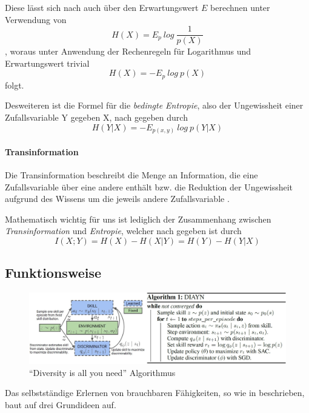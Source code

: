 Diese lässt sich nach \cite{elements_cover} auch über den Erwartungswert $ E $ berechnen unter Verwendung von
\begin{equation*}
    H(X) = E_p\ log\ \frac{1}{p(X)} \label{eq:entropy_1}
\end{equation*}
, woraus unter Anwendung der Rechenregeln für Logarithmus und Erwartungswert trivial
\begin{equation}
    H(X) = - E_p\ log\ p(X) \label{eq:entropy_2}
\end{equation}
folgt.

Desweiteren ist die Formel für die \textit{bedingte Entropie}, also der Ungewissheit einer Zufallsvariable Y gegeben X, nach \cite{elements_cover} gegeben durch
\begin{equation}
    H(Y|X) = - E_{p(x,y)}\ log\ p(Y|X) \label{eq:condit_entropy}
\end{equation}

\paragraph{Transinformation}

Die Transinformation beschreibt die Menge an Information, die eine Zufallsvariable über eine andere enthält bzw. die Reduktion der Ungewissheit aufgrund des Wissens um die jeweils andere Zufallsvariable \cite{elements_cover}.

Mathematisch wichtig für uns ist lediglich der Zusammenhang zwischen \textit{Transinformation} und \textit{Entropie}, welcher nach \cite{elements_cover} gegeben ist durch
\begin{equation}
    I(X;Y) = H(X) - H(X|Y) = H(Y) - H(Y|X) \label{eq:trans_ent}
\end{equation}

\subsection{Funktionsweise}
\label{sec:diversity_howitworks}
\begin{figure}[h]
\includegraphics[width=\textwidth, keepaspectratio=true]{images/algorithm_diayn.JPG}
\caption{``Diversity is all you need'' Algorithmus} \label{img:diayn}
\end{figure}
Das selbstständige Erlernen von brauchbaren Fähigkeiten, so wie in \cite{diversity_eysenbach} beschrieben, baut auf drei Grundideen auf.


